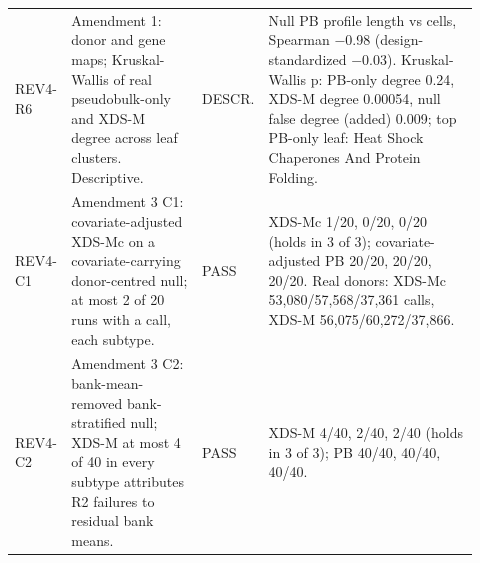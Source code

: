\begin{table}[p]
\begin{tabular}{@{}>{\raggedright\arraybackslash}p{0.100\linewidth}>{\raggedright\arraybackslash}p{0.285\linewidth}>{\raggedright\arraybackslash}p{0.085\linewidth}>{\raggedright\arraybackslash}p{0.450\linewidth}@{}}
REV4-R6 & Amendment 1: donor and gene maps; Kruskal-Wallis of real pseudobulk-only and XDS-M degree across leaf clusters. Descriptive. & DESCR. & Null PB profile length vs cells, Spearman $-$0.98 (design-standardized $-$0.03). Kruskal-Wallis p: PB-only degree 0.24, XDS-M degree 0.00054, null false degree (added) 0.009; top PB-only leaf: Heat Shock Chaperones And Protein Folding. \\
REV4-C1 & Amendment 3 C1: covariate-adjusted XDS-Mc on a covariate-carrying donor-centred null; at most 2 of 20 runs with a call, each subtype. & PASS & XDS-Mc 1/20, 0/20, 0/20 (holds in 3 of 3); covariate-adjusted PB 20/20, 20/20, 20/20. Real donors: XDS-Mc 53,080/57,568/37,361 calls, XDS-M 56,075/60,272/37,866. \\
REV4-C2 & Amendment 3 C2: bank-mean-removed bank-stratified null; XDS-M at most 4 of 40 in every subtype attributes R2 failures to residual bank means. & PASS & XDS-M 4/40, 2/40, 2/40 (holds in 3 of 3); PB 40/40, 40/40, 40/40. \\
\bottomrule
\end{tabular}
\end{table}

